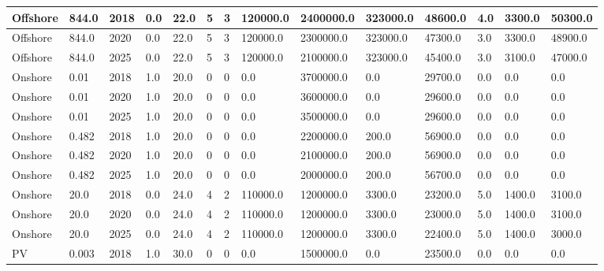 \documentclass[sigconf]{acmart}
\begin{document}
\begin{table*}[]
\begin{tabular}{|l|l|l|l|l|l|l|l|l|l|l|l|l|l|}
		Offshore      & 844.0       & 2018             & 0.0    & 22.0 & 5     & 3     & 120000.0 & 2400000.0 & 323000.0 & 48600.0 & 4.0   & 3300.0  & 50300.0  \\ \hline
		Offshore      & 844.0       & 2020             & 0.0    & 22.0 & 5     & 3     & 120000.0 & 2300000.0 & 323000.0 & 47300.0 & 3.0   & 3300.0  & 48900.0  \\ \hline
		Offshore      & 844.0       & 2025             & 0.0    & 22.0 & 5     & 3     & 120000.0 & 2100000.0 & 323000.0 & 45400.0 & 3.0   & 3100.0  & 47000.0  \\ \hline
		Onshore       & 0.01        & 2018             & 1.0    & 20.0 & 0     & 0     & 0.0      & 3700000.0 & 0.0      & 29700.0 & 0.0   & 0.0     & 0.0      \\ \hline
		Onshore       & 0.01        & 2020             & 1.0    & 20.0 & 0     & 0     & 0.0      & 3600000.0 & 0.0      & 29600.0 & 0.0   & 0.0     & 0.0      \\ \hline
		Onshore       & 0.01        & 2025             & 1.0    & 20.0 & 0     & 0     & 0.0      & 3500000.0 & 0.0      & 29600.0 & 0.0   & 0.0     & 0.0      \\ \hline
		Onshore       & 0.482       & 2018             & 1.0    & 20.0 & 0     & 0     & 0.0      & 2200000.0 & 200.0    & 56900.0 & 0.0   & 0.0     & 0.0      \\ \hline
		Onshore       & 0.482       & 2020             & 1.0    & 20.0 & 0     & 0     & 0.0      & 2100000.0 & 200.0    & 56900.0 & 0.0   & 0.0     & 0.0      \\ \hline
		Onshore       & 0.482       & 2025             & 1.0    & 20.0 & 0     & 0     & 0.0      & 2000000.0 & 200.0    & 56700.0 & 0.0   & 0.0     & 0.0      \\ \hline
		Onshore       & 20.0        & 2018             & 0.0    & 24.0 & 4     & 2     & 110000.0 & 1200000.0 & 3300.0   & 23200.0 & 5.0   & 1400.0  & 3100.0   \\ \hline
		Onshore       & 20.0        & 2020             & 0.0    & 24.0 & 4     & 2     & 110000.0 & 1200000.0 & 3300.0   & 23000.0 & 5.0   & 1400.0  & 3100.0   \\ \hline
		Onshore       & 20.0        & 2025             & 0.0    & 24.0 & 4     & 2     & 110000.0 & 1200000.0 & 3300.0   & 22400.0 & 5.0   & 1400.0  & 3000.0   \\ \hline
		PV            & 0.003       & 2018             & 1.0    & 30.0 & 0     & 0     & 0.0      & 1500000.0 & 0.0      & 23500.0 & 0.0   & 0.0     & 0.0      \\ \hline

\end{tabular}
\end{table*}
\end{document}
